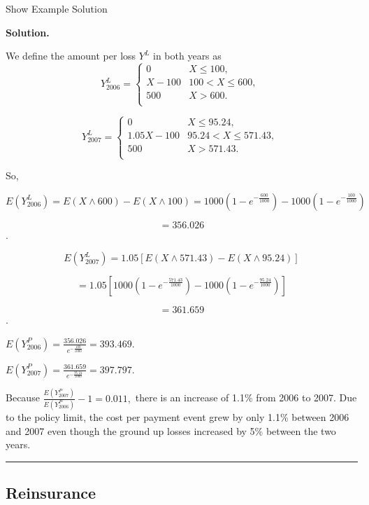 \documentclass[]{book}
\theoremstyle{definition}
\theoremstyle{definition}
\theoremstyle{definition}
\theoremstyle{remark}
\begin{document}
Show Example Solution

\hypertarget{toggleExampleLoss.4.5}{}
\textbf{Solution.}

We define the amount per loss \(Y^L\) in both years as
\[Y_{2006}^{L} = \left\{ \begin{matrix}
0 & X \leq 100, \\
X - 100 & 100 <  X \leq 600, \\
500 & X > 600. \\
\end{matrix} \right.\ \]

\[Y_{2007}^{L} = \left\{ \begin{matrix}
0 & X \leq 95.24, \\
1.05X - 100 & 95.24 <  X \leq 571.43, \\
500 & X > 571.43. \\
\end{matrix} \right.\ \]

So,

\[E\left( Y_{2006}^{L} \right) = E\left( X \land 600 \right) - E\left( X \land 100 \right) = 1000\left( {1 - e}^{- \frac{600}{1000}} \right) - 1000\left( {1 - e}^{- \frac{100}{1000}} \right)\]

\[= 356.026\].

\[E\left( Y_{2007}^{L} \right) = 1.05\left\lbrack E\left( X \land 571.43 \right) - E\left( X \land 95.24 \right) \right\rbrack\]

\[= 1.05\left\lbrack 1000\left( {1 - e}^{- \frac{571.43}{1000}} \right) - 1000\left( {1 - e}^{- \frac{95.24}{1000}} \right) \right\rbrack\]

\[=361.659\].

\(E\left( Y_{2006}^{P} \right) = \frac{356.026}{e^{- \frac{100}{1000}}} = 393.469\).

\(E\left( Y_{2007}^{P} \right) = \frac{361.659}{e^{- \frac{95.24}{1000}}} = 397.797\).

Because
\(\frac{E\left( Y_{2007}^{P} \right)}{E\left( Y_{2006}^{P} \right)} -1 = 0.011,\)
there is an increase of 1.1\% from 2006 to 2007. Due to the policy
limit, the cost per payment event grew by only 1.1\% between 2006 and
2007 even though the ground up losses increased by 5\% between the two
years.

\begin{center}\rule{0.5\linewidth}{\linethickness}\end{center}

\subsection{Reinsurance}\label{reinsurance}
\end{document}

